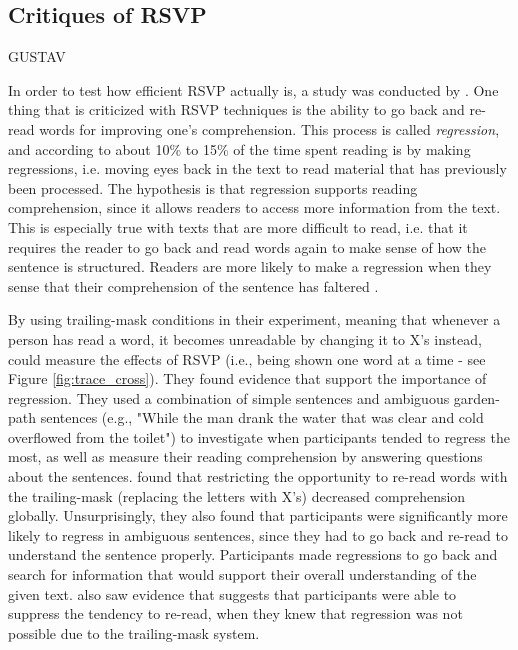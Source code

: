 \subsection{Critiques of RSVP}
GUSTAV

In order to test how efficient RSVP actually is, a study was conducted by . One thing that is criticized with RSVP techniques is the ability to go back and re-read words for improving one's comprehension. This process is called \textit{regression}, and according to \citeauthor{schotter_dont_2014} about 10\% to 15\% of the time spent reading is by making regressions, i.e. moving eyes back in the text to read material that has previously been processed. The hypothesis is that regression supports reading comprehension, since it allows readers to access more information from the text. This is especially true with texts that are more difficult to read, i.e. that it requires the reader to go back and read words again to make sense of how the sentence is structured. Readers are more likely to make a regression when they sense that their comprehension of the sentence has faltered \cite{schotter_dont_2014}.

By using trailing-mask conditions in their experiment, meaning that whenever a person has read a word, it becomes unreadable by changing it to X's instead,  could measure the effects of RSVP (i.e., being shown one word at a time - see Figure \ref{fig:trace_cross}). They found evidence that support the importance of regression. They used a combination of simple sentences and ambiguous garden-path sentences (e.g., "While
the man drank the water that was clear and cold overflowed from the toilet") to investigate when participants tended to regress the most, as well as measure their reading comprehension by answering questions about the sentences. \citeauthor{schotter_dont_2014} found that restricting the opportunity to re-read words with the trailing-mask (replacing the letters with X's) decreased comprehension globally. Unsurprisingly, they also found that participants were significantly more likely to regress in ambiguous sentences, since they had to go back and re-read to understand the sentence properly. Participants made regressions to go back and search for information that would support their overall understanding of the given text. \citeauthor{schotter_dont_2014} also saw evidence that suggests that participants were able to suppress the tendency to re-read, when they knew that regression was not possible due to the trailing-mask system.

